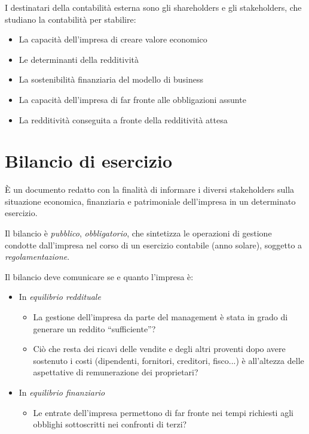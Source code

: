 \documentclass[10pt,a4paper,fleqn,oneside]{book}
\begin{document}
I destinatari della contabilità esterna sono gli \glspl{shareholder} e gli
\glspl{stakeholder}, che studiano la contabilità per stabilire:
\begin{itemize}
    \item La capacità dell’impresa di creare valore economico
    \item Le determinanti della redditività
    \item La sostenibilità finanziaria del modello di business
    \item La capacità dell’impresa di far fronte alle obbligazioni assunte
    \item La redditività conseguita a fronte della redditività attesa
\end{itemize}
 
\section{Bilancio di esercizio}
È un documento redatto con la finalità di informare i diversi \glspl{stakeholder}
sulla situazione economica, finanziaria e patrimoniale dell’impresa in un determinato
\gls{esercizio}.

Il bilancio è \emph{pubblico}, \emph{obbligatorio}, che sintetizza le operazioni
di gestione condotte dall’impresa nel corso di un esercizio contabile (anno solare),
soggetto a \emph{regolamentazione}.

Il bilancio deve comunicare se e quanto l’impresa è:
\begin{itemize}
    \item In \emph{equilibrio reddituale}
    \begin{itemize}
        \item La gestione dell’impresa da parte del management è stata in grado di generare un reddito ``sufficiente''?
        \item Ciò che resta dei ricavi delle vendite e degli altri proventi dopo avere sostenuto i costi
        (dipendenti, fornitori, creditori, fisco...) è all’altezza delle aspettative di remunerazione dei proprietari?
    \end{itemize}
    \item In \emph{equilibrio finanziario}
    \begin{itemize}
        \item Le entrate dell’impresa permettono di far fronte nei tempi richiesti agli obblighi sottoscritti nei confronti di terzi?
    \end{itemize}
\end{itemize}
\end{document}
